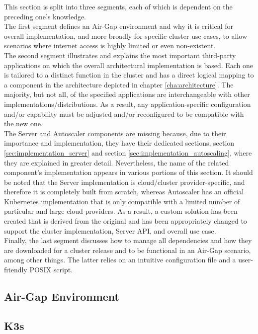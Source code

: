 This section is split into three segments, each of which is dependent on the preceding
one's knowledge. \\ %
The first segment defines an Air-Gap environment and why it is critical for overall
implementation, and more broadly for specific cluster use cases, to allow scenarios
where internet access is highly limited or even non-existent. \\ %
The second segment illustrates and explains the most important third-party applications
on which the overall architectural implementation is based. Each one is tailored
to a distinct function in the cluster and has a direct logical mapping to a
component in the architecture depicted in chapter \ref{cha:architecture}. The majority,
but not all, of the specified applications are interchangeable with other implementations/distributions.
As a result, any application-specific configuration and/or capability must be adjusted
and/or reconfigured to be compatible with the new one. \\ %
The Server and Autoscaler components are missing because, due to their
importance and implementation, they have their dedicated sections, section
\ref{sec:implementation_server} and section \ref{sec:implementation_autoscaling},
where they are explained in greater detail. Nevertheless, the name of the related
component's implementation appears in various portions of this section. It
should be noted that the Server implementation is cloud/cluster provider-specific,
and therefore it is completely built from scratch, whereas Autoscaler has an
official Kubernetes implementation that is only compatible with a limited number
of particular and large cloud providers. As a result, a custom solution has been
created that is derived from the original and has been appropriately changed to
support the cluster implementation, Server API, and overall use case. \\ %
Finally, the last segment discusses how to manage all dependencies and how they are
downloaded for a cluster release and to be functional in an Air-Gap scenario,
among other things. The latter relies on an intuitive configuration file and a user-friendly
POSIX script.

\subsection{Air-Gap Environment}
\label{subsec:implementation_dependencies_air_gap_environment}

\subsection{K3s}
\label{subsec:implementation_dependencies_k3s}

